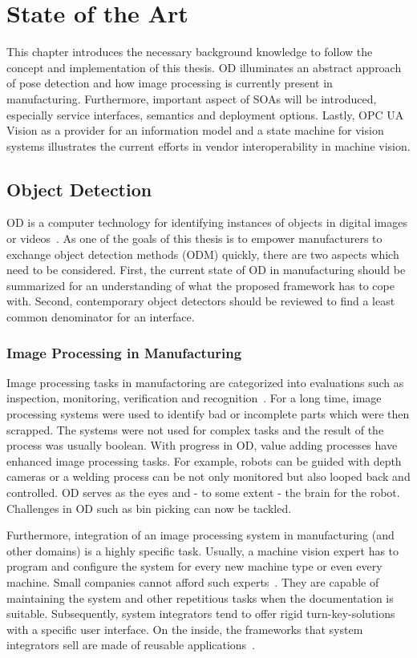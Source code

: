 \chapter{State of the Art\label{cha:chapter2}}
This chapter introduces the necessary background knowledge to follow the concept and implementation of this thesis. OD illuminates an abstract approach of pose detection and how image processing is currently present in manufacturing. Furthermore, important aspect of SOAs will be introduced, especially service interfaces, semantics and deployment options. Lastly, OPC UA Vision as a provider for an information model and a state machine for vision systems illustrates the current efforts in vendor interoperability in machine vision.

\section{Object Detection}
OD is a computer technology for identifying instances of objects in digital images or videos~\cite{Hornberg2017HandbookVision}. As one of the goals of this thesis is to empower manufacturers to exchange object detection methods (ODM) quickly, there are two aspects which need to be considered. First, the current state of OD in manufacturing should be summarized for an understanding of what the proposed framework has to cope with. Second, contemporary object detectors should be reviewed to find a least common denominator for an interface.

\subsection{Image Processing in Manufacturing}
Image processing tasks in manufactoring are categorized into evaluations such as inspection, monitoring, verification and recognition~\cite{Hornberg2017HandbookVision}. For a long time, image processing systems were used to identify bad or incomplete parts which were then scrapped. The systems were not used for complex tasks and the result of the process was usually boolean. With progress in OD, value adding processes have enhanced image processing tasks. For example, robots can be guided with depth cameras or a welding process can be not only monitored but also looped back and controlled. OD serves as the eyes and - to some extent - the brain for the robot. Challenges in OD such as bin picking can now be tackled. 

Furthermore, integration of an image processing system in manufacturing (and other domains) is a highly specific task. Usually, a machine vision expert has to program and configure the system for every new machine type or even every machine. Small companies cannot afford such experts~\cite{Hornberg2017HandbookVision}. They are capable of maintaining the system and other repetitious tasks when the documentation is suitable. Subsequently, system integrators tend to offer rigid turn-key-solutions with a specific user interface. On the inside, the frameworks that system integrators sell are made of reusable applications~\cite{Hornberg2017HandbookVision}.

